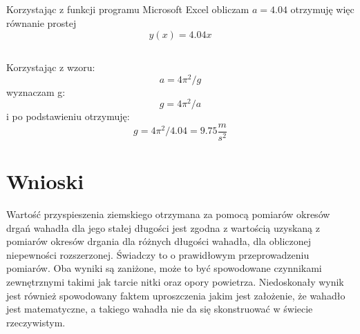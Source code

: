 \documentclass{article}
\begin{document}
    \subsection{}
        Korzystając z funkcji programu Microsoft Excel obliczam $a=4.04$ otrzymuję więc równanie prostej 
        \[
            y(x)=4.04x
        \]
    \subsection{}
        Korzystając z wzoru: 
        \[
            a=4\pi{}^{2}/g
        \]
        wyznaczam g:
        \[
            g=4\pi{}^{2}/a
        \]
        i po podstawieniu otrzymuję:
        \[
            g=4\pi{}^{2}/4.04 = 9.75\frac{m}{s^2}
        \]\newpage
    \section{Wnioski}
    Wartość przyspieszenia ziemskiego otrzymana za pomocą pomiarów okresów drgań wahadła dla jego stałej długości jest zgodna z wartością uzyskaną z pomiarów okresów drgania dla różnych długości wahadła, dla obliczonej niepewności rozszerzonej. Świadczy to o prawidłowym przeprowadzeniu pomiarów.
Oba wyniki są zaniżone, może to być spowodowane czynnikami zewnętrznymi takimi jak tarcie nitki oraz opory powietrza. Niedoskonały wynik jest również spowodowany faktem uproszczenia jakim jest założenie, że wahadło jest matematyczne, a takiego wahadła nie da się skonstruować w świecie rzeczywistym.

        
        
\end{document}
